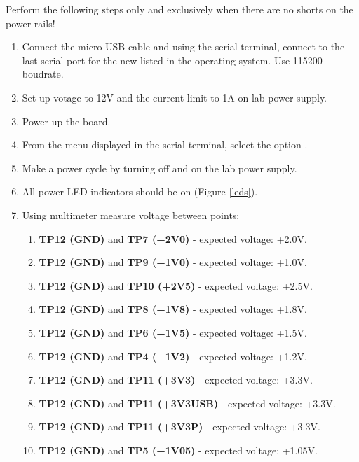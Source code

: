 \documentclass[12pt,oneside,a4]{article}
\begin{document}
Perform the following steps only and exclusively when there are no shorts on the power rails!
\begin{enumerate}
    \item Connect the micro USB cable and using the serial terminal, connect to the last serial port for the new listed in the operating system. Use 115200 boudrate.
    \item Set up votage to 12V and the current limit to 1A on lab power supply.
    \item Power up the board.
    \item From the menu displayed in the serial terminal, select the option .
    \item Make a power cycle by turning off and on the lab power supply.
    \item All power LED indicators should be on (Figure \ref{leds}).
    \item Using multimeter measure voltage between points:
    \begin{enumerate}
    	\item \textbf{TP12 (GND)} and \textbf{TP7 (+2V0)} - expected voltage: +2.0V.
    	\item \textbf{TP12 (GND)} and \textbf{TP9 (+1V0)} - expected voltage: +1.0V.
    	\item \textbf{TP12 (GND)} and \textbf{TP10 (+2V5)} - expected voltage: +2.5V.
    	\item \textbf{TP12 (GND)} and \textbf{TP8 (+1V8)} - expected voltage: +1.8V.
    	\item \textbf{TP12 (GND)} and \textbf{TP6 (+1V5)} - expected voltage: +1.5V.
    	\item \textbf{TP12 (GND)} and \textbf{TP4 (+1V2)} - expected voltage: +1.2V.
    	\item \textbf{TP12 (GND)} and \textbf{TP11 (+3V3)} - expected voltage: +3.3V.
    	\item \textbf{TP12 (GND)} and \textbf{TP11 (+3V3USB)} - expected voltage: +3.3V.
    	\item \textbf{TP12 (GND)} and \textbf{TP11 (+3V3P)} - expected voltage: +3.3V.
    	\item \textbf{TP12 (GND)} and \textbf{TP5 (+1V05)} - expected voltage: +1.05V.
\end{enumerate}
\end{enumerate}
\end{document}
